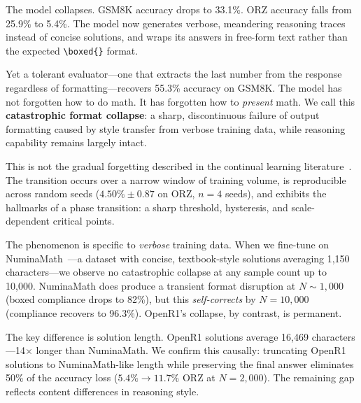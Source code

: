 \documentclass{article}
\begin{document}
The model collapses. GSM8K accuracy drops to 33.1\%. ORZ accuracy falls from 25.9\% to 5.4\%. The model now generates verbose, meandering reasoning traces instead of concise solutions, and wraps its answers in free-form text rather than the expected \texttt{\textbackslash boxed\{\}} format.

Yet a tolerant evaluator---one that extracts the last number from the response regardless of formatting---recovers 55.3\% accuracy on GSM8K. The model has not forgotten how to do math. It has forgotten how to \emph{present} math. We call this \textbf{catastrophic format collapse}: a sharp, discontinuous failure of output formatting caused by style transfer from verbose training data, while reasoning capability remains largely intact.

This is not the gradual forgetting described in the continual learning literature~\citep{kirkpatrick2017overcoming, luo2023empirical}. The transition occurs over a narrow window of training volume, is reproducible across random seeds ($4.50\% \pm 0.87$ on ORZ, $n{=}4$ seeds), and exhibits the hallmarks of a phase transition: a sharp threshold, hysteresis, and scale-dependent critical points.

The phenomenon is specific to \emph{verbose} training data. When we fine-tune on NuminaMath~\citep{li2024numinamath}---a dataset with concise, textbook-style solutions averaging 1,150 characters---we observe no catastrophic collapse at any sample count up to 10,000. NuminaMath does produce a transient format disruption at $N{\sim}1{,}000$ (boxed compliance drops to 82\%), but this \emph{self-corrects} by $N{=}10{,}000$ (compliance recovers to 96.3\%). OpenR1's collapse, by contrast, is permanent.

The key difference is solution length. OpenR1 solutions average 16,469 characters---14$\times$ longer than NuminaMath. We confirm this causally: truncating OpenR1 solutions to NuminaMath-like length while preserving the final answer eliminates 50\% of the accuracy loss ($5.4\% \to 11.7\%$ ORZ at $N{=}2{,}000$). The remaining gap reflects content differences in reasoning style.
\end{document}

